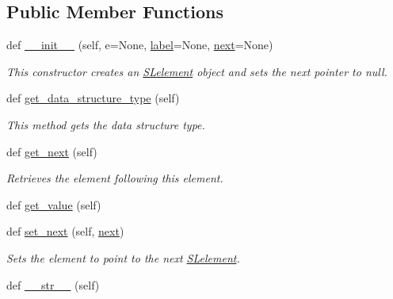 \subsection*{Public Member Functions}
\begin{DoxyCompactItemize}
\item 
def \mbox{\hyperlink{classbridges_1_1sl__element_1_1_s_lelement_ad2d298e03cbda62f6c8afac630179f16}{\+\_\+\+\_\+init\+\_\+\+\_\+}} (self, e=None, \mbox{\hyperlink{classbridges_1_1element_1_1_element_a97551dbb005cd5d1f13b65461290c6e3}{label}}=None, \mbox{\hyperlink{classbridges_1_1sl__element_1_1_s_lelement_a4fa8e9321dd2ce726da047ddc64adabf}{next}}=None)
\begin{DoxyCompactList}\small\item\em This constructor creates an \mbox{\hyperlink{classbridges_1_1sl__element_1_1_s_lelement}{S\+Lelement}} object and sets the next pointer to null. \end{DoxyCompactList}\item 
def \mbox{\hyperlink{classbridges_1_1sl__element_1_1_s_lelement_aa39835634a95d832d092dd3c057a49cf}{get\+\_\+data\+\_\+structure\+\_\+type}} (self)
\begin{DoxyCompactList}\small\item\em This method gets the data structure type. \end{DoxyCompactList}\item 
def \mbox{\hyperlink{classbridges_1_1sl__element_1_1_s_lelement_ae15a5fe6db55b10f3fe09f8039291960}{get\+\_\+next}} (self)
\begin{DoxyCompactList}\small\item\em Retrieves the element following this element. \end{DoxyCompactList}\item 
def \mbox{\hyperlink{classbridges_1_1sl__element_1_1_s_lelement_a0b39165322e4349714219077b13ac35a}{get\+\_\+value}} (self)
\item 
def \mbox{\hyperlink{classbridges_1_1sl__element_1_1_s_lelement_a607068c196b64971d16e4bf169b85cdd}{set\+\_\+next}} (self, \mbox{\hyperlink{classbridges_1_1sl__element_1_1_s_lelement_a4fa8e9321dd2ce726da047ddc64adabf}{next}})
\begin{DoxyCompactList}\small\item\em Sets the element to point to the next \mbox{\hyperlink{classbridges_1_1sl__element_1_1_s_lelement}{S\+Lelement}}. \end{DoxyCompactList}\item 
def \mbox{\hyperlink{classbridges_1_1sl__element_1_1_s_lelement_a985f205ebff285c3bc72d342adf1308e}{\+\_\+\+\_\+str\+\_\+\+\_\+}} (self)

\end{DoxyCompactItemize}
